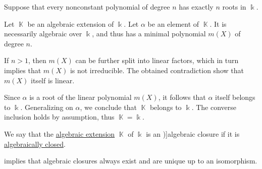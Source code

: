 \begin{defproof}
   Suppose that every nonconstant polynomial of degree \( n \) has exactly \( n \) roots in \( \Bbbk \).

  Let \( \BbbK \) be an algebraic extension of \( \Bbbk \). Let \( \alpha \) be an element of \( \BbbK \). It is necessarily algebraic over \( \Bbbk \), and thus has a minimal polynomial \( m(X) \) of degree \( n \).

  If \( n > 1 \), then \( m(X) \) can be further split into linear factors, which in turn implies that \( m(X) \) is not irreducible. The obtained contradiction show that \( m(X) \) itself is linear.

  Since \( \alpha \) is a root of the linear polynomial \( m(X) \), it follows that \( \alpha \) itself belongs to \( \Bbbk \). Generalizing on \( \alpha \), we conclude that \( \BbbK \) belongs to \( \Bbbk \). The converse inclusion holds by assumption, thus \( \BbbK = \Bbbk \).
\end{defproof}

\begin{definition}\label{def:algebraic_closure}
  We say that the \hyperref[def:algebraic_extension]{algebraic extension} \( \BbbK \) of \( \Bbbk \) is an \term[ru=алгебраическое замыкание (\cite[412]{Винберг2014Алгебра})]{algebraic closure} if it is \hyperref[def:algebraically_closed_field]{algebraically closed}.
\end{definition}
\begin{comments}
  \item {} implies that algebraic closures always exist and are unique up to an isomorphism.
\end{comments}


